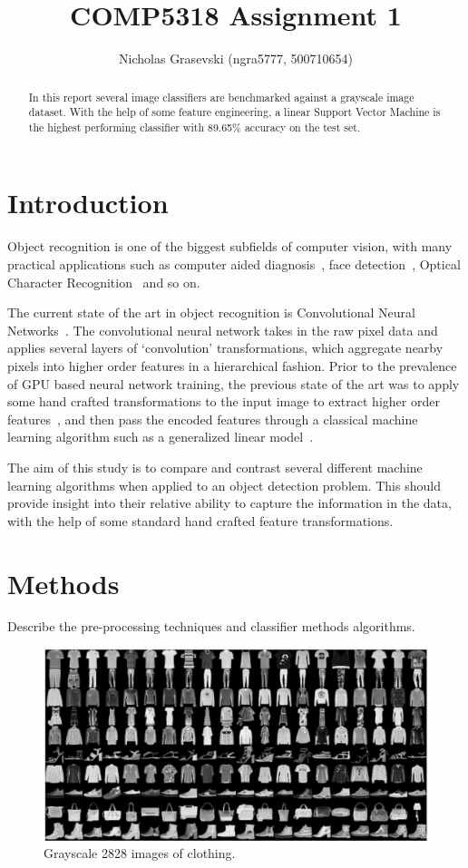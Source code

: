 \documentclass[landscape,twocolumn]{article}
\title{COMP5318 Assignment 1}
\author{Nicholas Grasevski (ngra5777, 500710654)}
\begin{document}
\maketitle
\begin{abstract}
In this report several image classifiers are benchmarked against a grayscale image dataset. With the help of some feature engineering, a linear Support Vector Machine is the highest performing classifier with 89.65\% accuracy on the test set.
\end{abstract}

\section{Introduction}
Object recognition is one of the biggest subfields of computer vision, with many practical applications such as computer aided diagnosis~\cite{doi2007computer}, face detection~\cite{hjelmaas2001face}, Optical Character Recognition~\cite{mori1999optical} and so on.

The current state of the art in object recognition is Convolutional Neural Networks~\cite{iandola2016squeezenet}. The convolutional neural network takes in the raw pixel data and applies several layers of `convolution' transformations, which aggregate nearby pixels into higher order features in a hierarchical fashion. Prior to the prevalence of GPU based neural network training, the previous state of the art was to apply some hand crafted transformations to the input image to extract higher order features~\cite{rybski2010visual}, and then pass the encoded features through a classical machine learning algorithm such as a generalized linear model~\cite{ebrahimzadeh2014efficient}.

The aim of this study is to compare and contrast several different machine learning algorithms when applied to an object detection problem. This should provide insight into their relative ability to capture the information in the data, with the help of some standard hand crafted feature transformations.

\section{Methods}
Describe the pre-processing techniques and classifier methods algorithms.

\begin{figure}[ht]
\includegraphics[width=\linewidth]{../Dataset_image}
\caption{Grayscale 28\times{}28 images of clothing.}\label{fig:images}
\end{figure}
\end{document}
